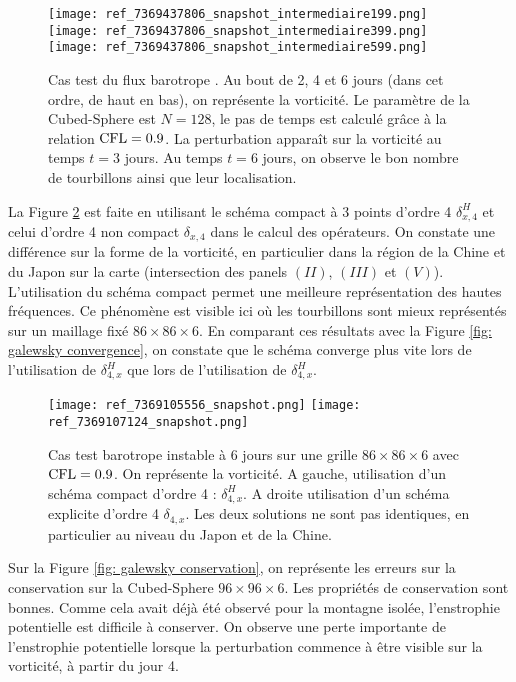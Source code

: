 \begin{figure}[htbp]
\begin{center}
\texttt{[image: ref\_7369437806\_snapshot\_intermediaire199.png]}
\texttt{[image: ref\_7369437806\_snapshot\_intermediaire399.png]}
\texttt{[image: ref\_7369437806\_snapshot\_intermediaire599.png]}
\end{center}
\caption{Cas test du flux barotrope \cite{Galewsky2004}. Au bout de 2, 4 et 6 jours (dans cet ordre, de haut en bas), on représente la vorticité. Le paramètre de la Cubed-Sphere est $N=128$, le pas de temps est calculé grâce à la relation $\text{CFL}=0.9$. La perturbation apparaît sur la vorticité au temps $t=3$ jours. Au temps $t=6$ jours, on observe le bon nombre de tourbillons ainsi que leur localisation.}
\label{fig: galewsky 246}
\end{figure}

La Figure \ref{fig: galewsky compact/explicite} est faite en utilisant le schéma compact à 3 points d'ordre 4 $\delta_{x,4}^H$ et celui d'ordre 4 non compact $\delta_{x,4}$ dans le calcul des opérateurs. On constate une différence sur la forme de la vorticité, en particulier dans la région de la Chine et du Japon sur la carte (intersection des panels $(II)$, $(III)$ et $(V)$). L'utilisation du schéma compact permet une meilleure représentation des hautes fréquences. Ce phénomène est visible ici où les tourbillons sont mieux représentés sur un maillage fixé $86 \times 86 \times 6$. En comparant ces résultats avec la Figure \ref{fig: galewsky convergence}, on constate que le schéma converge plus vite lors de l'utilisation de $\delta_{4,x}^H$ que lors de l'utilisation de $\delta_{4,x}^H$.

\begin{figure}[htbp]
\begin{center}
\texttt{[image: ref\_7369105556\_snapshot.png]}
\texttt{[image: ref\_7369107124\_snapshot.png]}
\end{center}
\caption{Cas test barotrope instable \cite{Galewsky2004} à 6 jours sur une grille $86 \times 86 \times 6$ avec $\text{CFL}=0.9$. On représente la vorticité. A gauche, utilisation d'un schéma compact d'ordre 4 : $\delta_{4,x}^H$. A droite utilisation d'un schéma explicite d'ordre 4 $\delta_{4,x}$. Les deux solutions ne sont pas identiques, en particulier au niveau du Japon et de la Chine.}
\label{fig: galewsky compact/explicite}
\end{figure}

Sur la Figure \ref{fig: galewsky conservation}, on représente les erreurs sur la conservation sur la Cubed-Sphere $96 \times 96 \times 6$. Les propriétés de conservation sont bonnes.  Comme cela avait déjà été observé pour la montagne isolée, l'enstrophie potentielle est difficile à conserver. On observe une perte importante de l'enstrophie potentielle lorsque la perturbation commence à être visible sur la vorticité, à partir du jour 4.

